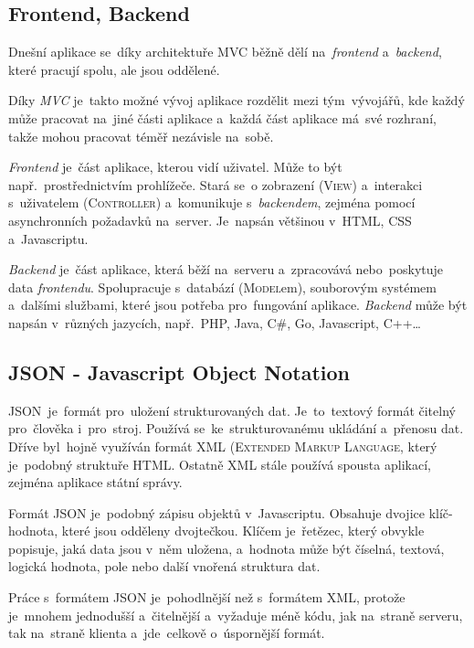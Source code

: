 \documentclass[14pt,a4paper]{article}
\begin{document}
        \subsection{Frontend, Backend}
        Dnešní aplikace se~díky architektuře \textsc{MVC} běžně dělí na~\emph{frontend} a~\emph{backend}, které pracují spolu, ale jsou oddělené.

        Díky \emph{MVC} je~takto možné vývoj aplikace rozdělit mezi tým~vývojářů, kde každý může pracovat na~jiné části aplikace a~každá část aplikace má~své rozhraní, takže mohou pracovat téměř nezávisle na~sobě.

        \emph{Frontend} je~část aplikace, kterou vidí uživatel. Může to být např.~prostřednictvím prohlížeče. Stará se~o zobrazení (\textsc{View}) a~interakci s~uživatelem (\textsc{Controller}) a~komunikuje s~\emph{backendem}, zejména pomocí asynchronních požadavků na~server. Je~napsán většinou v~HTML, CSS a~Javascriptu.

        \emph{Backend} je~část aplikace, která běží na~serveru a~zpracovává nebo~poskytuje data \emph{frontendu}. Spolupracuje s~databází (\textsc{Model}em), souborovým systémem a~dalšími službami, které jsou potřeba pro~fungování aplikace. \emph{Backend} může být napsán v~různých jazycích, např.~PHP, Java, C\#, Go, Javascript, C++\dots

        \subsection{JSON - Javascript Object Notation}
        \textsc{JSON}~je~formát pro~uložení strukturovaných dat. Je~to~textový formát čitelný pro~člověka i~pro~stroj. Používá se~ke~strukturovanému ukládání a~přenosu dat. Dříve byl~hojně využíván formát \textsc{XML} (\textsc{Extended Markup Language}, který je~podobný struktuře \textsc{HTML}. Ostatně \textsc{XML} stále používá spousta aplikací, zejména aplikace státní správy.

        Formát \textsc{JSON} je~podobný zápisu objektů v~Javascriptu. Obsahuje dvojice klíč-hodnota, které jsou odděleny dvojtečkou. Klíčem je~řetězec, který obvykle popisuje, jaká data jsou v~něm uložena, a~hodnota může být číselná, textová, logická hodnota, pole nebo další vnořená struktura dat.
        
        Práce s~formátem \textsc{JSON} je~pohodlnější než s~formátem XML, protože je~mnohem jednodušší a~čitelnější a~vyžaduje méně kódu, jak na~straně serveru, tak na~straně klienta a~jde~celkově o~úspornější formát.
\end{document}

